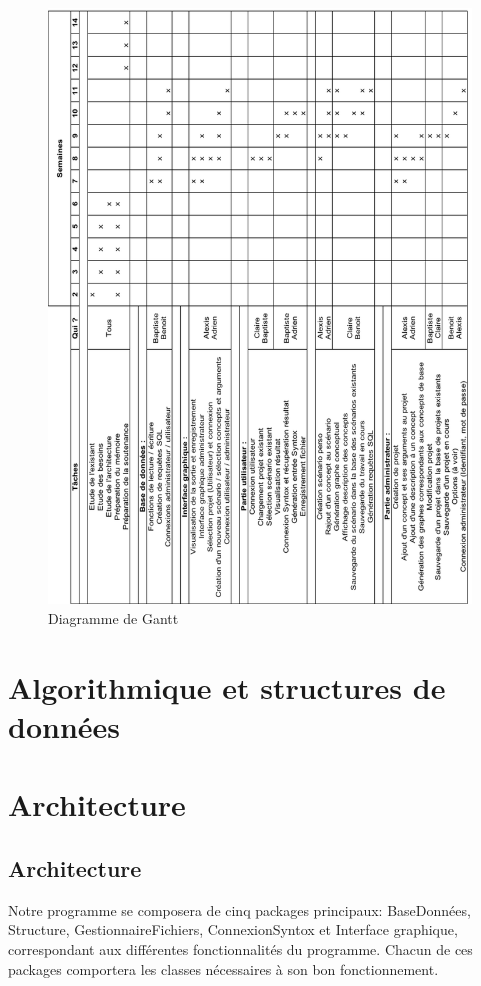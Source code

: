 \documentclass[12pt]{report}
\begin{document}
\begin{figure}
\centering
\includegraphics[scale=1]{GANTT.png}
\caption{Diagramme de Gantt}
\end{figure}



\chapter{Algorithmique et structures de données}

\chapter{Architecture}

\section{Architecture}
Notre programme se composera de cinq packages principaux: BaseDonnées, Structure, GestionnaireFichiers, ConnexionSyntox et Interface graphique, correspondant aux différentes fonctionnalités du programme.
Chacun de ces packages comportera les classes nécessaires à son bon fonctionnement.
\end{document}

